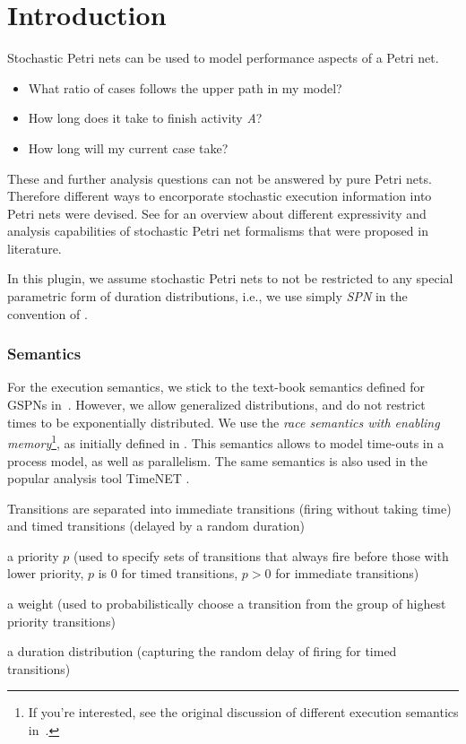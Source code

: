 \section*{Introduction}
\label{sec:intro}
Stochastic Petri nets can be used to model performance aspects of a Petri net.
\begin{itemize}
  \item What ratio of cases follows the upper path in my model?
  \item How long does it take to finish activity \emph{A}?
  \item How long will my current case take?
\end{itemize}
These and further analysis questions can not be answered by pure Petri nets. Therefore different ways to encorporate stochastic execution information into Petri nets were devised. See \cite{ciardo1994characterization} for an overview about different expressivity and analysis capabilities of stochastic Petri net formalisms that were proposed in literature.

In this plugin, we assume stochastic Petri nets to not be restricted to any special parametric form of duration distributions, i.e., we use simply \emph{SPN} in the convention of \cite{ciardo1994characterization}.

\subsubsection{Semantics}
For the execution semantics, we stick to the text-book semantics defined for GSPNs in~\cite{marsan1984class}. However, we allow generalized distributions, and do not restrict times to be exponentially distributed. We use the \emph{race semantics with enabling memory}\footnote{If you're interested, see the original discussion of different execution semantics in~\cite{marsan1989execution}.}, as initially defined in \cite{marsan1989execution}. This semantics allows to model time-outs in a process model, as well as parallelism. The same semantics is also used in the popular analysis tool TimeNET \cite{german1995timenet}. 

Transitions are separated into immediate transitions (firing without taking time) and timed transitions (delayed by a random duration) 
\begin{compactitem}
  \item a priority $p$ (used to specify sets of transitions that always fire before those with lower priority, $p$ is 0 for timed transitions, $p > 0$ for immediate transitions)
  \item a weight (used to probabilistically choose a transition from the group of highest priority transitions)
  \item a duration distribution (capturing the random delay of firing for timed transitions) 
\end{compactitem}

